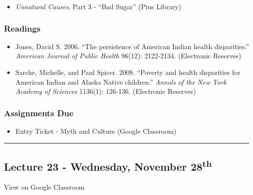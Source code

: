 \documentclass[]{book}
\providecommand{\tightlist}{%
  \setlength{\itemsep}{0pt}\setlength{\parskip}{0pt}}
\theoremstyle{definition}
\theoremstyle{definition}
\theoremstyle{definition}
\theoremstyle{remark}
\begin{document}
\begin{itemize}
\tightlist
\item
  \emph{Unnatural Causes}, Part 3 - ``Bad Sugar'' (Pius Library)
\end{itemize}

\hypertarget{readings-24}{%
\subsubsection*{Readings}\label{readings-24}}

\begin{itemize}
\tightlist
\item
  Jones, David S. 2006. ``The persistence of American Indian health
  disparities.'' \emph{American Journal of Public Health} 96(12):
  2122-2134. (Electronic Reserves)
\item
  Sarche, Michelle, and Paul Spicer. 2008. ``Poverty and health
  disparities for American Indian and Alaska Native children.''
  \emph{Annals of the New York Academy of Sciences} 1136(1): 126-136.
  (Electronic Reserves)
\end{itemize}

\hypertarget{assignments-due-6}{%
\subsubsection*{Assignments Due}\label{assignments-due-6}}

\begin{itemize}
\tightlist
\item
  Entry Ticket - Myth and Culture (Google Classroom)
\end{itemize}

\begin{center}\rule{0.5\linewidth}{\linethickness}\end{center}

\hypertarget{lecture-23---wednesday-november-28th}{%
\subsection*{\texorpdfstring{Lecture 23 - Wednesday, November
28\textsuperscript{th}}{Lecture 23 - Wednesday, November 28th}}\label{lecture-23---wednesday-november-28th}}

View on Google Classroom
\end{document}
